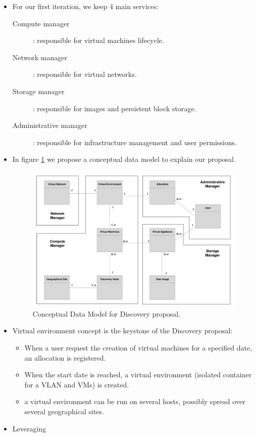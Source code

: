 \begin{itemize}

	\item For our first iteration, we keep 4 main services:
		\begin{description}

			\item [Compute manager] : responsible for virtual machines lifecycle.

			\item [Network manager] : responsible for virtual networks.

			\item [Storage manager] : responsible for images and persistent block storage.

			\item [Administrative manager] : responsible for infrastructure management and user permissions.  

		\end{description}


	\item In figure \ref{fig:mcd} we propose a conceptual data model to explain our proposal.


	\begin{figure}
		\centering
		\includegraphics[width=0.75\linewidth]{Figures/mcd_3.pdf}
		\caption{Conceptual Data Model for Discovery proposal.}%
		\label{fig:mcd}%
	\end{figure}

	\item Virtual environment concept is the keystone of the Discovery proposal:
		
		\begin{itemize}

			\item When a user request the creation of virtual machines for a specified date, an allocation is registered.

			\item When the start date is reached, a virtual environment (isolated container for a VLAN and VMs) is created.

			\item a virtual environment can be run on several hosts, possibly spread over several geographical sites.

		\end{itemize}

	\item Leveraging

\end{itemize}